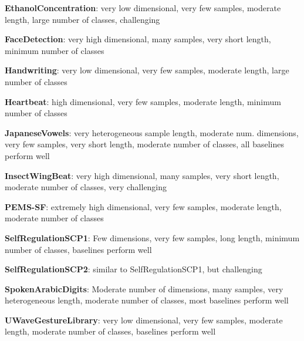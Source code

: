 \documentclass{article} \usepackage{iclr2021_conference,times}
\begin{document}
\textbf{EthanolConcentration}: very low dimensional, very few samples, moderate length, large number of classes, challenging

\textbf{FaceDetection}: very high dimensional, many samples, very short length, minimum number of classes

\textbf{Handwriting}: very low dimensional, very few samples, moderate length, large number of classes

\textbf{Heartbeat}: high dimensional, very few samples, moderate length, minimum number of classes

\textbf{JapaneseVowels}: very heterogeneous sample length,  moderate num. dimensions, very few samples, very short length, moderate number of classes, all baselines perform well

\textbf{InsectWingBeat}: very high dimensional, many samples, very short length, moderate number of classes, very challenging

\textbf{PEMS-SF}: extremely high dimensional, very few samples, moderate length, moderate number of classes

\textbf{SelfRegulationSCP1}: Few dimensions, very few samples, long length, minimum number of classes, baselines perform well

\textbf{SelfRegulationSCP2}: similar to SelfRegulationSCP1, but challenging

\textbf{SpokenArabicDigits}: Moderate number of dimensions, many samples, very heterogeneous length, moderate number of classes, most baselines perform well

\textbf{UWaveGestureLibrary}: very low dimensional, very few samples, moderate length, moderate number of classes, baselines perform well
\end{document}
